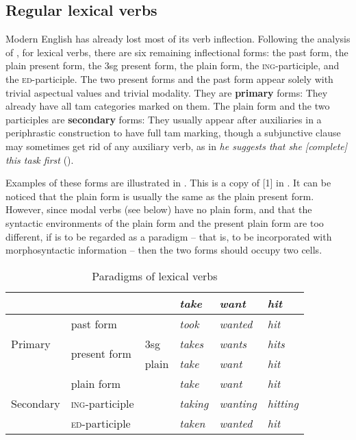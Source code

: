 \documentclass[UTF8, a4paper, oneside, scheme=plain, 12pt]{ctexbook}
\newcommand*{\citesec}[1]{\S~{#1}}
\newcommand*{\citechap}[1]{Ch.~{#1}}
\newcommand*{\citechapsec}[2]{\citechap{#1}.\citesec{#2}}
\newcommand*{\concept}[1]{\textbf{#1}}
\newcommand{\form}[1]{\emph{#1}}
\newcommand{\formcat}[1]{\textsc{#1}}
\begin{document}
\subsection{Regular lexical verbs}\label{sec:verb-forms}

Modern English has already lost most of its verb inflection.
Following the analysis of \citet[\citechapsec{3}{1.1}]{cgel},
for lexical verbs,
there are six remaining inflectional forms: 
the past form, the plain present form, 
the 3sg present form,
the plain form, the \formcat{ing}-participle,
and the \formcat{ed}-participle.
The two present forms and the past form appear solely 
with trivial aspectual values and trivial modality.
They are \concept{primary} forms:
They already have all \acs{tam} categories marked on them.
The plain form and the two participles are \concept{secondary} forms:
They usually appear after auxiliaries 
in a periphrastic construction to have full \acs{tam} marking,
though a subjunctive clause may sometimes get rid of any auxiliary verb,
as in \form{he suggests that she [complete] this task first} ().

Examples of these forms are illustrated in . 
This is a copy of [1] in \citet[\citesec{1.1}]{cgel}.
It can be noticed that the plain form is usually the same as the plain present form.
However, since modal verbs (see below) have no plain form,
and that the syntactic environments of the plain form and the present plain form are too different,
if  is to be regarded as a paradigm
-- that is, to be incorporated with morphosyntactic information -- 
then the two forms should occupy two cells.

\begin{table}[H]
    \caption{Paradigms of lexical verbs}
    \label{tbl:lexical-inflection}
    \centering
    \begin{tabular}{@{}llllll@{}}
    \toprule
    \multicolumn{1}{l}{}       &                               &       & \form{take}   & \form{want}    & \form{hit}     \\ \midrule
    \multirow{3}{*}{Primary}   & past form                     &       & \form{took}   & \form{wanted}  & \form{hit}     \\
                               & \multirow{2}{*}{present form} & 3sg   & \form{takes}  & \form{wants}   & \form{hits}    \\
                               &                               & plain & \form{take}   & \form{want}    & \form{hit}     \\ \midrule
    \multirow{3}{*}{Secondary} & plain form                    &       & \form{take}   & \form{want}    & \form{hit}     \\
                               & \formcat{ing}-participle       &       & \form{taking} & \form{wanting} & \form{hitting} \\
                               & \formcat{ed}-participle        &       & \form{taken}  & \form{wanted}  & \form{hit}     \\ \bottomrule
    \end{tabular}
\end{table}
\end{document}
